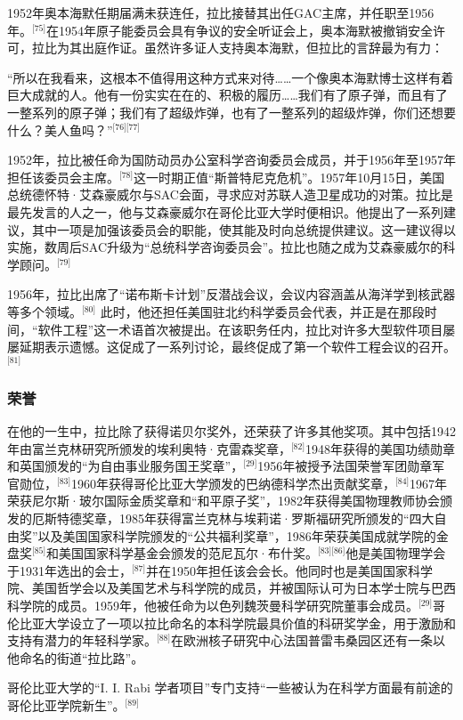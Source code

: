 1952年奥本海默任期届满未获连任，拉比接替其出任GAC主席，并任职至1956年。\(^\text{[75]}\)在1954年原子能委员会具有争议的安全听证会上，奥本海默被撤销安全许可，拉比为其出庭作证。虽然许多证人支持奥本海默，但拉比的言辞最为有力：

“所以在我看来，这根本不值得用这种方式来对待……一个像奥本海默博士这样有着巨大成就的人。他有一份实实在在的、积极的履历……我们有了原子弹，而且有了一整系列的原子弹；我们有了超级炸弹，也有了一整系列的超级炸弹，你们还想要什么？美人鱼吗？”\(^\text{[76][77]}\)

1952年，拉比被任命为国防动员办公室科学咨询委员会成员，并于1956年至1957年担任该委员会主席。\(^\text{[78]}\)这一时期正值“斯普特尼克危机”。1957年10月15日，美国总统德怀特·艾森豪威尔与SAC会面，寻求应对苏联人造卫星成功的对策。拉比是最先发言的人之一，他与艾森豪威尔在哥伦比亚大学时便相识。他提出了一系列建议，其中一项是加强该委员会的职能，使其能及时向总统提供建议。这一建议得以实施，数周后SAC升级为“总统科学咨询委员会”。拉比也随之成为艾森豪威尔的科学顾问。\(^\text{[79]}\)

1956年，拉比出席了“诺布斯卡计划”反潜战会议，会议内容涵盖从海洋学到核武器等多个领域。\(^\text{[80]}\) 此时，他还担任美国驻北约科学委员会代表，并正是在那段时间，“软件工程”这一术语首次被提出。在该职务任内，拉比对许多大型软件项目屡屡延期表示遗憾。这促成了一系列讨论，最终促成了第一个软件工程会议的召开。\(^\text{[81]}\)
\subsubsection{荣誉}
在他的一生中，拉比除了获得诺贝尔奖外，还荣获了许多其他奖项。其中包括1942年由富兰克林研究所颁发的埃利奥特·克雷森奖章，\(^\text{[82]}\)1948年获得的美国功绩勋章和英国颁发的“为自由事业服务国王奖章”，\(^\text{[29]}\)1956年被授予法国荣誉军团勋章军官勋位，\(^\text{[83]}\)1960年获得哥伦比亚大学颁发的巴纳德科学杰出贡献奖章，\(^\text{[84]}\)1967年荣获尼尔斯·玻尔国际金质奖章和“和平原子奖”，1982年获得美国物理教师协会颁发的厄斯特德奖章，1985年获得富兰克林与埃莉诺·罗斯福研究所颁发的“四大自由奖”以及美国国家科学院颁发的“公共福利奖章”，1986年荣获美国成就学院的金盘奖\(^\text{[85]}\)和美国国家科学基金会颁发的范尼瓦尔·布什奖。\(^\text{[83][86]}\)他是美国物理学会于1931年选出的会士，\(^\text{[87]}\)并在1950年担任该会会长。他同时也是美国国家科学院、美国哲学会以及美国艺术与科学院的成员，并被国际认可为日本学士院与巴西科学院的成员。1959年，他被任命为以色列魏茨曼科学研究院董事会成员。\(^\text{[29]}\)哥伦比亚大学设立了一项以拉比命名的本科学院最具价值的科研奖学金，用于激励和支持有潜力的年轻科学家。\(^\text{[88]}\)在欧洲核子研究中心法国普雷韦桑园区还有一条以他命名的街道“拉比路”。

哥伦比亚大学的“I. I. Rabi 学者项目”专门支持“一些被认为在科学方面最有前途的哥伦比亚学院新生”。\(^\text{[89]}\)
